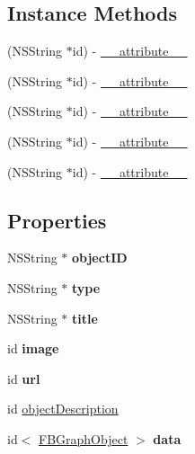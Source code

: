\subsection*{Instance Methods}
\begin{DoxyCompactItemize}
\item 
(N\+S\+String $\ast$id) -\/ \hyperlink{protocolFBOpenGraphObject-p_a91cba0c24949be9c3158598b20fc276e}{\+\_\+\+\_\+attribute\+\_\+\+\_\+}
\item 
(N\+S\+String $\ast$id) -\/ \hyperlink{protocolFBOpenGraphObject-p_a91cba0c24949be9c3158598b20fc276e}{\+\_\+\+\_\+attribute\+\_\+\+\_\+}
\item 
(N\+S\+String $\ast$id) -\/ \hyperlink{protocolFBOpenGraphObject-p_a91cba0c24949be9c3158598b20fc276e}{\+\_\+\+\_\+attribute\+\_\+\+\_\+}
\item 
(N\+S\+String $\ast$id) -\/ \hyperlink{protocolFBOpenGraphObject-p_a91cba0c24949be9c3158598b20fc276e}{\+\_\+\+\_\+attribute\+\_\+\+\_\+}
\item 
(N\+S\+String $\ast$id) -\/ \hyperlink{protocolFBOpenGraphObject-p_a91cba0c24949be9c3158598b20fc276e}{\+\_\+\+\_\+attribute\+\_\+\+\_\+}
\end{DoxyCompactItemize}
\subsection*{Properties}
\begin{DoxyCompactItemize}
\item 
\mbox{\label{protocolFBOpenGraphObject-p_af3f89aece9f66f5c3efb2faed3000c78}} 
N\+S\+String $\ast$ {\bfseries object\+ID}
\item 
\mbox{\label{protocolFBOpenGraphObject-p_a463c72be86dbb31e04f201eabd25019c}} 
N\+S\+String $\ast$ {\bfseries type}
\item 
\mbox{\label{protocolFBOpenGraphObject-p_a9beca871146c9211cd925a952d39f0da}} 
N\+S\+String $\ast$ {\bfseries title}
\item 
\mbox{\label{protocolFBOpenGraphObject-p_a0a36e02b2d90ecadb217bba923ce10f2}} 
id {\bfseries image}
\item 
\mbox{\label{protocolFBOpenGraphObject-p_a5853197f2e4e1287d3e48b990cc6a416}} 
id {\bfseries url}
\item 
id \hyperlink{protocolFBOpenGraphObject-p_a0d00a4eefc8f313c02a0fb01a32c8eb8}{object\+Description}
\item 
\mbox{\label{protocolFBOpenGraphObject-p_ae43b85d8a9ce458a91ee598d0cf87b5c}} 
id$<$ \hyperlink{interfaceFBGraphObject}{F\+B\+Graph\+Object} $>$ {\bfseries data}
\end{DoxyCompactItemize}


